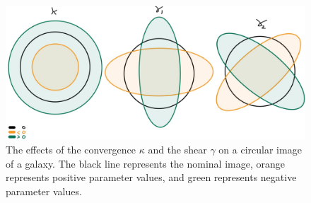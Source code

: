 \begin{figure}
    \begin{center}
      \includegraphics[width=\textwidth]{figs/shear-11.jpg}
    \end{center}
    \caption{The effects of the convergence $\kappa$ and  the shear $\gamma$ on a circular image of a galaxy. The black line represents the nominal image, orange represents positive parameter values, and green represents negative parameter values.}
    \label{fig:shears}
\end{figure}
